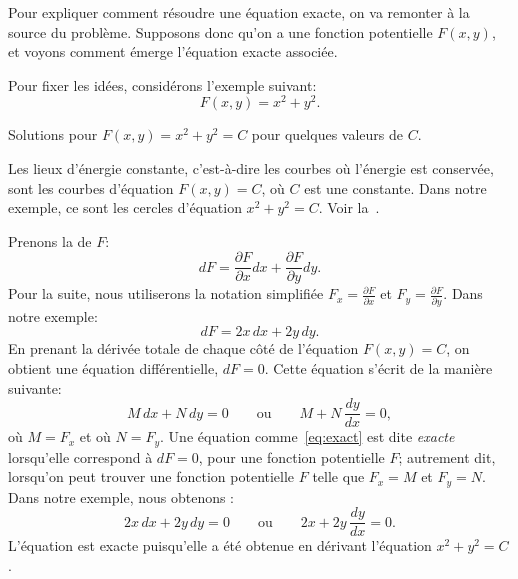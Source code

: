 Pour expliquer comment résoudre une équation exacte, on va remonter à la source du problème.
Supposons donc qu'on a une fonction potentielle $F(x , y)$, et voyons comment émerge l'équation exacte associée.

Pour fixer les idées, considérons l'exemple suivant:
\begin{equation*}
	F(x,y) = x^2+y^2 .
\end{equation*}

\begin{mywrapfig}[17]{3.25in}
	\capstart {}
	\caption{Solutions pour $F(x,y) = x^2+y^2 = C$ pour quelques valeurs de $C$.\label{exact:circlesfig}}
\end{mywrapfig}
Les lieux d'énergie constante, c'est-à-dire les courbes où l'énergie est conservée, sont les courbes d'équation $F(x,y) = C$,
où $C$ est une constante.  Dans notre exemple, ce sont les cercles d'équation $x^2+y^2=C$.
Voir  la~.

Prenons la \emph{} de $F$:
\begin{equation*}
	dF = \frac{\partial F}{\partial x} dx + \frac{\partial F}{\partial y} dy .
\end{equation*}
Pour la suite, nous utiliserons la notation simplifiée
	$F_x = \frac{\partial F}{\partial x}$ et
	$F_y = \frac{\partial F}{\partial y}$.
Dans notre exemple:
\begin{equation*}
	dF = 2x \, dx + 2y \, dy .
\end{equation*}
En prenant la dérivée totale de chaque côté de l'équation $F(x,y) = C$, on obtient une équation différentielle,  $dF = 0$.
Cette équation s'écrit de la manière suivante:
\begin{equation}\label{eq:exact}
	M \, dx + N \, dy = 0 \qquad \text{ou} \qquad	M + N \, \frac{dy}{dx} = 0,
\end{equation}
où $M=F_x$ et où $N=F_y$.  Une équation comme~\eqref{eq:exact} est dite \emph{exacte} lorsqu'elle correspond à $dF = 0$,
pour une fonction potentielle $F$; autrement dit, lorsqu'on peut trouver une fonction potentielle $F$ telle que $F_x=M$ et $F_y=N$.
Dans notre exemple, nous obtenons :
\begin{equation*}
	2x \, dx + 2y \, dy = 0 \qquad 	\text{ou} \qquad  2x + 2y \, \frac{dy}{dx} = 0 .
\end{equation*}
L'équation est exacte puisqu'elle a été obtenue en dérivant l'équation $x^2+y^2=C$.

